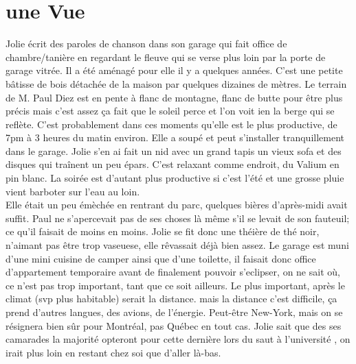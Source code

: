 \clearpage
\section*{une Vue}
Jolie écrit des paroles de chanson dans son garage qui fait office de
chambre/tanière en regardant le fleuve qui se verse plus loin par la porte de
garage vitrée. Il a été aménagé pour elle il y a quelques années. C’est une
petite bâtisse de bois détachée de la maison par quelques dizaines de mètres.
Le terrain de M. Paul Diez est en pente à flanc de montagne, flanc de butte
pour être plus précis mais c’est assez ça fait que le soleil perce et l’on voit
ien la berge qui se reflète.  C’est probablement dans ces moments qu’elle est
le plus productive, de 7pm à 3 heures du matin environ. Elle a  soupé et peut
s’installer tranquillement dans le garage. Jolie s’en ai fait un nid avec un
grand tapis un vieux sofa et des disques qui traînent un peu épars. C’est
relaxant comme endroit, du Valium en pin blanc. La soirée est d’autant plus
productive si c’est l’été et une grosse pluie vient barboter sur l'eau au
loin.\\

Elle était un peu émèchée en rentrant du parc, quelques bières d'après-midi
avait suffit. Paul ne s'apercevait pas de ses choses là même s'il se levait de
son fauteuil; ce qu'il faisait de moins en moins. Jolie se fit donc une théière
de thé noir, n'aimant pas être trop vaseuese, elle rêvassait déjà bien assez.
Le garage est muni d'une mini cuisine de camper ainsi que d'une toilette, il
faisait donc office d'appartement temporaire avant de finalement pouvoir
s'eclipser, on ne sait où, ce n'est pas trop important, tant que ce soit
ailleurs. Le plus important, après le climat (svp plus habitable) serait la
distance. mais la distance c'est difficile, ça prend d'autres langues, des
avions, de l'énergie. Peut-être New-York, mais on se résignera bien sûr pour
Montréal, pas Québec en tout cas. Jolie sait que des ses camarades la majorité
opteront pour cette dernière lors du saut à l'université , on irait plus loin
en restant chez soi que d'aller là-bas. 




\clearpage
